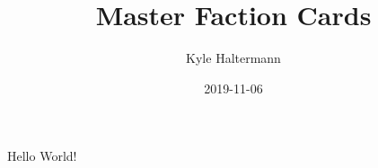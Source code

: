 \documentclass{article}
\title{Master Faction Cards}
\date{2019-11-06}
\author{Kyle Haltermann}
\begin{document}
	\maketitle
	\newpage

	Hello World!
\end{document}
